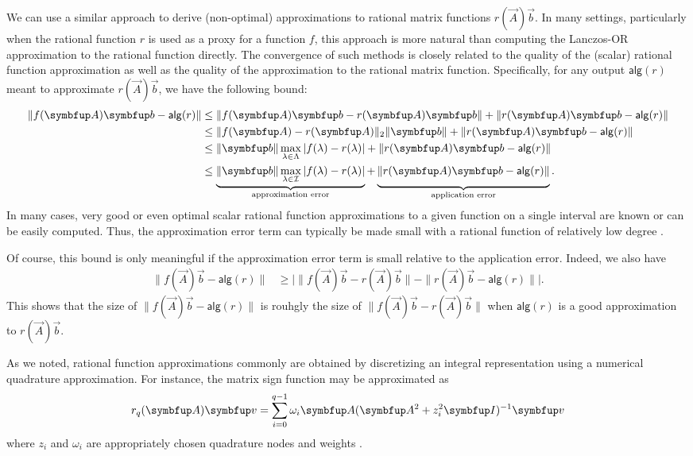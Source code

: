 We can use a similar approach to derive (non-optimal) approximations to rational matrix functions $r(\vec{A})\vec{b}$. 
In many settings, particularly when the rational function $r$ is used as a proxy for a function $f$, this approach is more natural than computing the Lanczos-OR approximation to the rational function directly.
The convergence of such methods is closely related to the quality of the (scalar) rational function approximation as well as the quality of the approximation to the rational matrix function.
Specifically, for any output $\mathsf{alg}(r)$ meant to approximate $r(\vec{A})\vec{b}$, we have the following bound:
\begin{align}
\| f(\vec{A}) \vec{b} - \mathsf{alg}(r) \|
&\leq 
\nonumber
\| f(\vec{A}) \vec{b} - r(\vec{A}) \vec{b} \| +  \| r(\vec{A}) \vec{b} - \mathsf{alg}(r) \|
\\&\leq \nonumber
\| f(\vec{A}) - r(\vec{A}) \|_2 \|\vec{b} \| +  \| r(\vec{A}) \vec{b} - \mathsf{alg}(r) \|
\\&\leq \nonumber
\|\vec{b}\|  \max_{\lambda \in \Lambda} | f(\lambda) - r(\lambda) | +  \| r(\vec{A}) \vec{b} - \mathsf{alg}(r) \|
\\& \leq \underbrace{\|\vec{b}\|  \max_{\lambda \in \mathcal{I}} | f(\lambda) - r(\lambda) |}_{\text{approximation error}} 
    + \underbrace{\vphantom{\max_{\lambda\in\mathcal{I}}}\| r(\vec{A}) \vec{b} - \mathsf{alg}(r) \|}_{\text{application error}}.
    \label{eqn:triangle_ineq}
\end{align}
In many cases, very good or even optimal scalar rational function approximations to a given function on a single interval are known or can be easily computed. 
Thus, the approximation error term can typically be made small with a rational function of relatively low degree \cite{trefethen_19,nakatsukasa_sete_trefethen_18}.

Of course, this bound is only meaningful if the approximation error term is small relative to the application error.
Indeed, we also have
\begin{align}
\| f(\vec{A}) \vec{b} - \mathsf{alg}(r) \|
&\geq 
\big| \| f(\vec{A}) \vec{b} - r(\vec{A}) \vec{b} \| -  \| r(\vec{A}) \vec{b} - \mathsf{alg}(r) \| \big|.
\label{eqn:reverse_triangle_ineq}
\end{align}
This shows that the size of $\| f(\vec{A}) \vec{b} - \mathsf{alg}(r) \|$ is rouhgly the size of $\| f(\vec{A}) \vec{b} - r(\vec{A}) \vec{b} \|$ when $\mathsf{alg}(r)$ is a good approximation to $r(\vec{A}) \vec{b}$.


As we noted, rational function approximations commonly are obtained by discretizing an integral representation using a numerical quadrature approximation. 
For instance, the matrix sign function may be approximated as 
\begin{equation}
    \label{eqn:rational_func}
    r_q\A\vec{v} = \sum_{i=0}^{q-1} \omega_i \vec{A} (\vec{A}^2 + z_i^2 \vec{I})^{-1} \vec{v}
\end{equation}
where $z_i$ and $\omega_i$ are appropriately chosen quadrature nodes and weights \cite{hale_higham_trefethen_08}.

